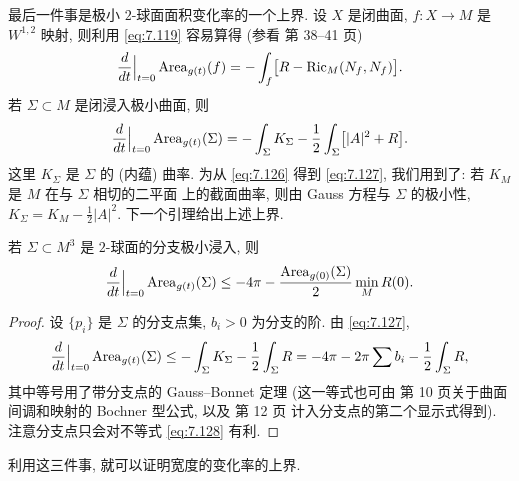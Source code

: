 最后一件事是极小 $2$-球面面积变化率的一个上界. 设 $X$ 是闭曲面,
$f:X\to M$ 是 $W^{1,2}$ 映射, 则利用 \eqref{eq:7.119} 容易算得 (参看
\cite{Ha2} 第 38--41 页)
\begin{equation}
\frac{d}{dt}\Big|_{t=0}\operatorname{Area}_{g(t)}(f)
=-\int_f\bigl[R-\operatorname{Ric}_M(N_f,N_f)\bigr].
\label{eq:7.126}
\end{equation}
若 $\Sigma\subset M$ 是闭浸入极小曲面, 则
\begin{equation}
\frac{d}{dt}\Big|_{t=0}\operatorname{Area}_{g(t)}(\Sigma)
=-\int_{\Sigma}K_{\Sigma}
-\frac12\int_{\Sigma}\bigl[|A|^2+R\bigr].
\label{eq:7.127}
\end{equation}
这里 $K_{\Sigma}$ 是 $\Sigma$ 的 (内蕴) 曲率. 为从 \eqref{eq:7.126} 得到
\eqref{eq:7.127}, 我们用到了: 若 $K_M$ 是 $M$ 在与 $\Sigma$ 相切的二平面
上的截面曲率, 则由 Gauss 方程与 $\Sigma$ 的极小性,
$K_{\Sigma}=K_M-\frac12|A|^2$. 下一个引理给出上述上界.

\begin{lemma}
\label{lem:7.21}
若 $\Sigma\subset M^3$ 是 $2$-球面的分支极小浸入, 则
\begin{equation}
\frac{d}{dt}\Big|_{t=0}\operatorname{Area}_{g(t)}(\Sigma)
\leq-4\pi-\frac{\operatorname{Area}_{g(0)}(\Sigma)}2\min_MR(0).
\label{eq:7.128}
\end{equation}
\end{lemma}

\begin{proof}
设 $\{p_i\}$ 是 $\Sigma$ 的分支点集, $b_i>0$ 为分支的阶. 由
\eqref{eq:7.127},
\begin{equation}
\frac{d}{dt}\Big|_{t=0}\operatorname{Area}_{g(t)}(\Sigma)
\leq-\int_{\Sigma}K_{\Sigma}-\frac12\int_{\Sigma}R
=-4\pi-2\pi\sum b_i-\frac12\int_{\Sigma}R,
\label{eq:7.129}
\end{equation}
其中等号用了带分支点的 Gauss--Bonnet 定理 (这一等式也可由 \cite{ScYa2}
第 10 页关于曲面间调和映射的 Bochner 型公式, 以及 \cite{ScYa2} 第 12 页
计入分支点的第二个显示式得到). 注意分支点只会对不等式 \eqref{eq:7.128}
有利.
\end{proof}

利用这三件事, 就可以证明宽度的变化率的上界.


